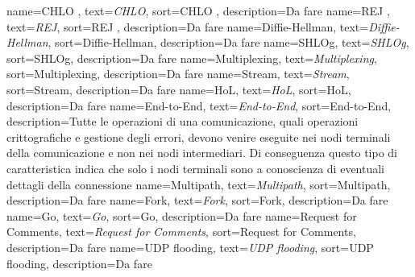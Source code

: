  {
    name=CHLO ,
    text=\emph{CHLO},
    sort=CHLO ,
    description={Da fare}
}
 {
    name=REJ ,
    text=\emph{REJ},
    sort=REJ ,
    description={Da fare}
}
 {
    name=Diffie-Hellman,
    text=\emph{Diffie-Hellman},
    sort=Diffie-Hellman,
    description={Da fare}
}
 {
    name=SHLOg,
    text=\emph{SHLOg},
    sort=SHLOg,
    description={Da fare}
}
 {
    name=Multiplexing,
    text=\emph{Multiplexing},
    sort=Multiplexing,
    description={Da fare}
}
 {
    name=Stream,
    text=\emph{Stream},
    sort=Stream,
    description={Da fare}
}
 {
    name=HoL,
    text=\emph{HoL},
    sort=HoL,
    description={Da fare}
}
 {
    name=End-to-End,
    text=\emph{End-to-End},
    sort=End-to-End,
    description={Tutte le operazioni di una comunicazione, quali operazioni crittografiche e gestione degli errori, devono venire eseguite nei nodi terminali della comunicazione e non nei nodi intermediari. 
    Di conseguenza questo tipo di caratteristica indica che solo i nodi terminali sono a conoscienza di eventuali dettagli della connessione}
}
 {
    name=Multipath,
    text=\emph{Multipath},
    sort=Multipath,
    description={Da fare}
}
 {
    name=Fork,
    text=\emph{Fork},
    sort=Fork,
    description={Da fare}
}
 {
    name=Go,
    text=\emph{Go},
    sort=Go,
    description={Da fare}
}
 {
    name=Request for Comments,
    text=\emph{Request for Comments},
    sort=Request for Comments,
    description={Da fare}
}
 {
    name=UDP flooding,
    text=\emph{UDP flooding},
    sort=UDP flooding,
    description={Da fare}
}